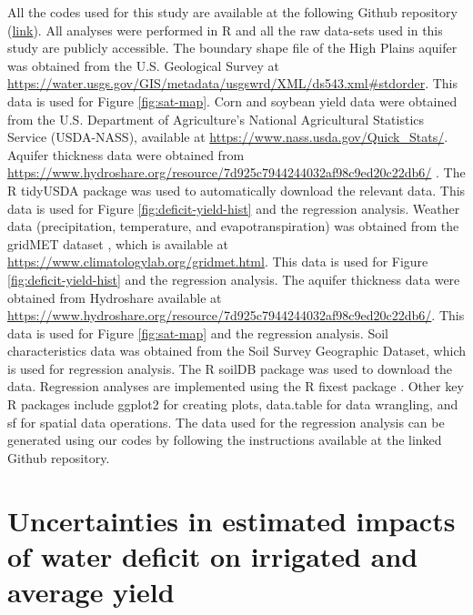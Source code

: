 \documentclass[
]{article}
\begin{document}
All the codes used for this study are available at the following Github repository (\href{https://github.com/tmieno2/Drought-Production-Risk-Aquifer}{link}). All analyses were performed in R \citep{R} and all the raw data-sets used in this study are publicly accessible. The boundary shape file of the High Plains aquifer was obtained from the U.S. Geological Survey at \url{https://water.usgs.gov/GIS/metadata/usgswrd/XML/ds543.xml#stdorder}. This data is used for Figure \ref{fig:sat-map}. Corn and soybean yield data were obtained from the U.S. Department of Agriculture's National Agricultural Statistics Service (USDA-NASS), available at \url{https://www.nass.usda.gov/Quick_Stats/}. Aquifer thickness data were obtained from \url{https://www.hydroshare.org/resource/7d925c7944244032af98c9ed20c22db6/} \citep{haacker2023}. The R tidyUSDA package \citep{RtidyUSDA} was used to automatically download the relevant data. This data is used for Figure \ref{fig:deficit-yield-hist} and the regression analysis. Weather data (precipitation, temperature, and evapotranspiration) was obtained from the gridMET dataset \citep{Abatzoglou2013}, which is available at \url{https://www.climatologylab.org/gridmet.html}. This data is used for Figure \ref{fig:deficit-yield-hist} and the regression analysis. The aquifer thickness data were obtained from Hydroshare \citep{haacker2023} available at \url{https://www.hydroshare.org/resource/7d925c7944244032af98c9ed20c22db6/}. This data is used for Figure \ref{fig:sat-map} and the regression analysis. Soil characteristics data was obtained from the Soil Survey Geographic Dataset, which is used for regression analysis. The R soilDB package \citep{Rsoildb} was used to download the data. Regression analyses are implemented using the R fixest package \citep{Rfixest}. Other key R packages include ggplot2 \citep{Rggplot2} for creating plots, data.table \citep{Rdatatable} for data wrangling, and sf \citep{Rsf} for spatial data operations. The data used for the regression analysis can be generated using our codes by following the instructions available at the linked Github repository.

\clearpage

\hypertarget{appendix-appendix}{%
\appendix}


\hypertarget{reg-conf}{%
\section{Uncertainties in estimated impacts of water deficit on irrigated and average yield}\label{reg-conf}}
\end{document}
